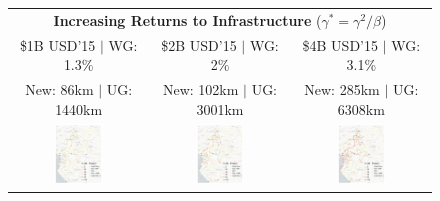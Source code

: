 \documentclass[a4paper]{article}
\begin{document}
\begin{figure}[H]
{\begin{tabular}{@{}c@{}c@{}c@{}}
\multicolumn{3}{c}{\textbf{Increasing Returns to Infrastructure} ($\gamma^* = \gamma^2/\beta$)} \\ [0.5em]
\$1B USD'15 $|$ WG: 1.3\% & \$2B USD'15 $|$ WG: 2\% & \$4B USD'15 $|$ WG: 3.1\%  \\
New: 86km $|$ UG: 1440km & New: 102km $|$ UG: 3001km & New: 285km $|$ UG: 6308km \\ 
\includegraphics[width=0.38\textwidth, trim= {0.9cm 0 0.9cm 0}, clip]{"../figures/GE/trans_africa_network_GE_add_20g_1b_fixed_cgc_irs_sigma3.8_rho0_julia_MACR_90kmh_google_perc_ug.pdf"} & 
\includegraphics[width=0.38\textwidth, trim= {0.9cm 0 0.9cm 0}, clip]{"../figures/GE/trans_africa_network_GE_add_20g_2b_fixed_cgc_irs_sigma3.8_rho0_julia_MACR_90kmh_google_perc_ug.pdf"} &
\includegraphics[width=0.38\textwidth, trim= {0.9cm 0 0.9cm 0}, clip]{"../figures/GE/trans_africa_network_GE_add_20g_4b_fixed_cgc_irs_sigma3.8_rho0_julia_MACR_90kmh_google_perc_ug.pdf"}  

\end{tabular}}
\end{figure}
\end{document}
